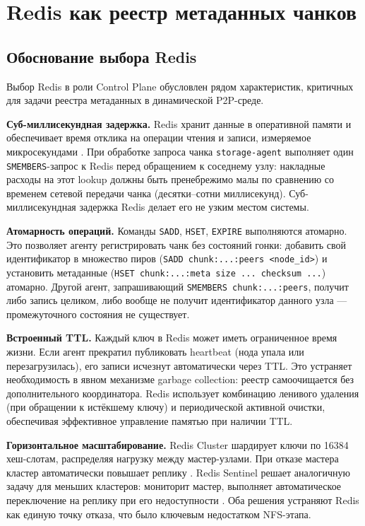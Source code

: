 \section{Redis как реестр метаданных чанков}

\subsection*{Обоснование выбора Redis}

Выбор Redis в роли Control Plane обусловлен рядом характеристик, критичных для задачи реестра метаданных в динамической P2P-среде.

\textbf{Суб-миллисекундная задержка.} Redis хранит данные в оперативной памяти и обеспечивает время отклика на операции чтения и записи, измеряемое микросекундами \cite{redis_cluster_docs}. При обработке запроса чанка \texttt{storage-agent} выполняет один \texttt{SMEMBERS}-запрос к Redis перед обращением к соседнему узлу: накладные расходы на этот lookup должны быть пренебрежимо малы по сравнению со временем сетевой передачи чанка (десятки--сотни миллисекунд). Суб-миллисекундная задержка Redis делает его не узким местом системы.

\textbf{Атомарность операций.} Команды \texttt{SADD}, \texttt{HSET}, \texttt{EXPIRE} выполняются атомарно. Это позволяет агенту регистрировать чанк без состояний гонки: добавить свой идентификатор в множество пиров (\texttt{SADD chunk:...:peers <node\_id>}) и установить метаданные (\texttt{HSET chunk:...:meta size ... checksum ...}) атомарно. Другой агент, запрашивающий \texttt{SMEMBERS chunk:...:peers}, получит либо запись целиком, либо вообще не получит идентификатор данного узла --- промежуточного состояния не существует.

\textbf{Встроенный TTL.} Каждый ключ в Redis может иметь ограниченное время жизни. Если агент прекратил публиковать heartbeat (нода упала или перезагрузилась), его записи исчезнут автоматически через TTL. Это устраняет необходимость в явном механизме garbage collection: реестр самоочищается без дополнительного координатора. Redis использует комбинацию ленивого удаления (при обращении к истёкшему ключу) и периодической активной очистки, обеспечивая эффективное управление памятью при наличии TTL.

\textbf{Горизонтальное масштабирование.} Redis Cluster шардирует ключи по 16384 хеш-слотам, распределяя нагрузку между мастер-узлами. При отказе мастера кластер автоматически повышает реплику \cite{redis_cluster_docs}. Redis Sentinel решает аналогичную задачу для меньших кластеров: мониторит мастер, выполняет автоматическое переключение на реплику при его недоступности \cite{redis_sentinel_docs}. Оба решения устраняют Redis как единую точку отказа, что было ключевым недостатком NFS-этапа.

